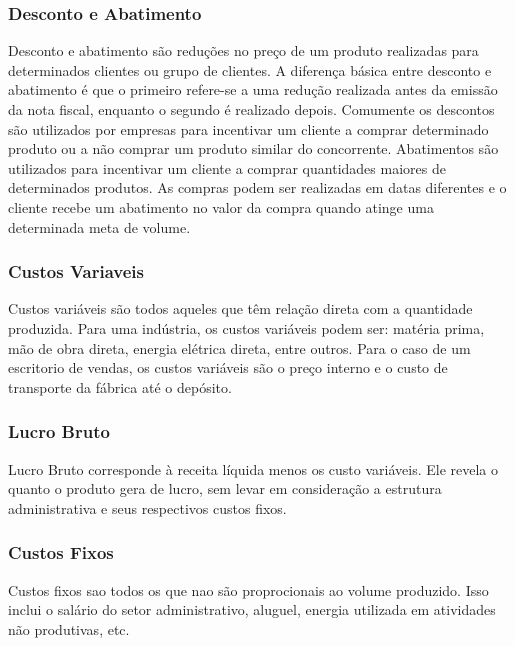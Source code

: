 \documentclass[12pt]{article}
\begin{document}
\subsubsection{Desconto e Abatimento}
Desconto e abatimento são reduções no preço de um produto realizadas para determinados clientes ou grupo de clientes. A diferença básica entre desconto e abatimento é que o primeiro refere-se a uma redução realizada antes da emissão da nota fiscal, enquanto o segundo é realizado depois. Comumente os descontos são utilizados por empresas para incentivar um cliente a comprar determinado produto ou a não comprar um produto similar do concorrente. Abatimentos são utilizados para incentivar um cliente a comprar quantidades maiores de determinados produtos. As compras podem ser realizadas em datas diferentes e o cliente recebe um abatimento no valor da compra quando atinge uma determinada meta de volume.

\subsubsection{Custos Variaveis}
Custos variáveis são todos aqueles que têm relação direta com a quantidade produzida. Para uma indústria, os custos variáveis podem ser: matéria prima, mão de obra direta, energia elétrica direta, entre outros. Para o caso de um escritorio de vendas, os custos variáveis são o preço interno e o custo de transporte da fábrica até o depósito.

\subsubsection{Lucro Bruto}
Lucro Bruto corresponde à receita líquida menos os custo variáveis. Ele revela o quanto o produto gera de lucro, sem levar em consideração a estrutura administrativa e seus respectivos custos fixos.

\subsubsection{Custos Fixos}
Custos fixos sao todos os que nao são proprocionais ao volume produzido. Isso inclui o salário do setor administrativo, aluguel, energia utilizada em atividades não produtivas, etc.

\end{document}
